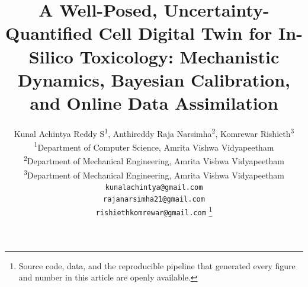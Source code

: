 \documentclass[journal]{IEEEtran}
\begin{document}
\title{A Well-Posed, Uncertainty-Quantified Cell Digital Twin for In-Silico
Toxicology: Mechanistic Dynamics, Bayesian Calibration, and Online Data
Assimilation}

\author{
Kunal Achintya Reddy S\textsuperscript{1},
Anthireddy Raja Narsimha\textsuperscript{2},
Komrewar Rishieth\textsuperscript{3} \\[0.5em]
\textsuperscript{1}Department of Computer Science, Amrita Vishwa Vidyapeetham \\
\textsuperscript{2}Department of Mechanical Engineering, Amrita Vishwa Vidyapeetham \\
\textsuperscript{3}Department of Mechanical Engineering, Amrita Vishwa Vidyapeetham \\[0.5em]
\texttt{kunalachintya@gmail.com} \\
\texttt{rajanarsimha21@gmail.com} \\
\texttt{rishiethkomrewar@gmail.com}%
\thanks{Source code, data, and the reproducible pipeline that generated every
figure and number in this article are openly available.}
}

\markboth{}{}
\maketitle
\end{document}
